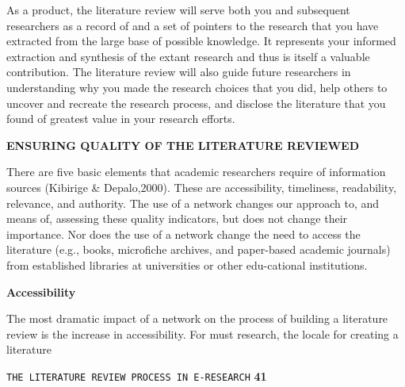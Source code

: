 \documentclass{book}
\begin{document}
\vspace*{0.3cm}

\hspace*{0.5cm} As a product, the literature review will serve both you and subsequent researchers as a record of and a set of pointers to the research that you have extracted from the large base of possible knowledge. It represents your informed extraction and synthesis of the extant research and thus is itself a valuable contribution. The literature review will also guide future researchers in understanding why you made the research choices that you did, help others to uncover and recreate the research process, and disclose the literature that you found of greatest value in your research efforts.\\

\vspace*{0.5cm}

\large{
\textbf{ENSURING QUALITY OF THE LITERATURE REVIEWED}
}
\vspace*{0.2cm}

\small{There are five basic elements that academic researchers require of information sources (Kibirige \& Depalo,2000). These are accessibility, timeliness, readability, relevance, and authority. The use of a network changes our approach to, and means of, assessing these quality indicators, but does not change their importance. Nor does the use of a network change the need to access the literature (e.g., books, microfiche archives, and paper-based academic journals) from established libraries at universities or other edu-cational institutions.\\
}

\vspace*{0.3cm}
\large{
\textbf{Accessibility}
}
\vspace*{0.2cm}

\small{The most dramatic impact of a network on the process of building a literature review is the increase in accessibility. For must research, the locale for creating a literature }

\newpage

\begin{flushright}
 \texttt{THE LITERATURE REVIEW PROCESS IN E-RESEARCH} \hspace*{1cm} \textbf{41}
\end{flushright}
\end{document}
